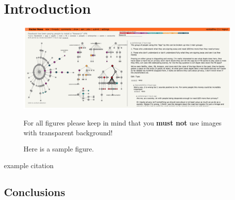 \documentclass{egpubl}
\begin{document}
\section{Introduction}


\begin{figure}[htb]
  \centering
  \includegraphics[width=.8\linewidth]{images/teaser.png}
  \parbox[t]{.9\columnwidth}{\relax
           For all figures please keep in mind that you \textbf{must not}
           use images with transparent background! 
           }
  \caption{\label{fig:firstExample}
           Here is a sample figure.}
\end{figure}

example citation \cite{FolDamFeiHug.etal93}

\subsection{Conclusions}


%



\end{document}
